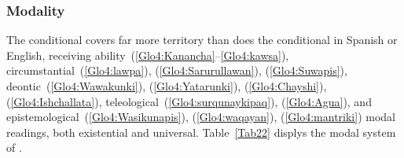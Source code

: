 \begin{table}
\small\centering
\caption{Regular conditional inflection -- actor-object suffixes}\label{Tab21b}
\end{table}

\subsubsection{Modality}\label{ssec:modality}
The \SYQ{} conditional covers far more territory than does the conditional in Spanish or English, receiving ability~(\ref{Glo4:Kanancha}--\ref{Glo4:kawsa}), circumstantial~(\ref{Glo4:lawpa}), (\ref{Glo4:Sarurullawan}), (\ref{Glo4:Suwapis}), deontic~(\ref{Glo4:Wawakunki}), (\ref{Glo4:Yatarunki}), (\ref{Glo4:Chayshi}), (\ref{Glo4:Ishchallata}), teleological~(\ref{Glo4:surqunaykipaq}), (\ref{Glo4:Agua}), and epistemological~(\ref{Glo4:Wasikunapis}), (\ref{Glo4:waqayan}), (\ref{Glo4:mantriki}) modal readings, both existential and universal. Table~\ref{Tab22} displys the modal system of \SYQ{}.


